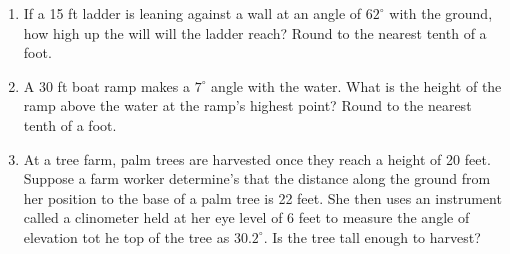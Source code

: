 \begin{enumerate}
\begin{enumerate}
	
	\vfill

\item {}
	
	\vfill

\end{enumerate}
\newpage

\item If a 15 ft ladder is leaning against a wall at an angle of $62^\circ$ with the ground, how high up the will will the ladder reach?  Round to the nearest tenth of a foot.\vfill

\item A 30 ft boat ramp makes a $7^\circ$ angle with the water.  What is the height of the ramp above the water at the ramp's highest point?  Round to the nearest tenth of a foot.\vfill

\item At a tree farm, palm trees are harvested once they reach a height of 20 feet.  Suppose a farm worker determine's that the distance along the ground from her position to the base of a palm tree is 22 feet.  She then uses an instrument called a clinometer held at her eye level of 6 feet to measure the angle of elevation tot he top of the tree as $30.2^\circ$.  Is the tree tall enough to harvest?\vfill
%
%
\end{enumerate}

